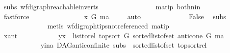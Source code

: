 \begin{isabellebody}
\ subs\ wf{\isacharunderscore}{\kern0pt}digraph{\isachardot}{\kern0pt}reachable{}{\isacharunderscore}{\kern0pt}in{\isacharunderscore}{\kern0pt}verts{\isacharparenleft}{\kern0pt}{}{\isacharparenright}{\kern0pt}\ {}{\isacharparenleft}{\kern0pt}{}{\isacharcomma}{\kern0pt}{}{\isacharparenright}{\kern0pt}\ \isanewline
\ \ \ \ \ \ \ \ \ \ \ \ \ \ ma{\isacharunderscore}{\kern0pt}tip\ both{\isacharunderscore}{\kern0pt}nin\isanewline
\ \ \ \ \ \ \ \ \ \ \ \ \isamarkupfalse%
\ fastforce\ \ \isanewline
\ \ \ \ \ \ \ \ \ \ \isamarkupfalse%
\ \isamarkupfalse%
\ {\isachardoublequoteopen}x\ {\isasymrightarrow}\isactrlsup {\isacharplus}{\kern0pt}\isactrlbsub G\isactrlesub \ ma{\isachardoublequoteclose}\ \isamarkupfalse%
\ {}{\isacharparenleft}{\kern0pt}{}{\isacharparenright}{\kern0pt}\ \isamarkupfalse%
\ auto\isanewline
\ \ \ \ \ \ \ \ \ \ \isamarkupfalse%
\ \isamarkupfalse%
\ False\ \isamarkupfalse%
\ subs\ \ {}{\isacharparenleft}{\kern0pt}{}{\isacharparenright}{\kern0pt}\isanewline
\ \ \ \ \ \ \ \ \ \ \ \ \isamarkupfalse%
\ {\isacharparenleft}{\kern0pt}metis\ wf{\isacharunderscore}{\kern0pt}digraph{\isachardot}{\kern0pt}tips{\isacharunderscore}{\kern0pt}not{\isacharunderscore}{\kern0pt}referenced\ ma{\isacharunderscore}{\kern0pt}tip{\isacharparenright}{\kern0pt}\ \ \isanewline
\ \ \ \ \ \ \ \ \isamarkupfalse%
\isanewline
\ \ \ \ \ \ \ \ \isamarkupfalse%
\ x{\isacharunderscore}{\kern0pt}ant\isanewline
\ \ \ \ \ \ \ \ \isamarkupfalse%
\ \isamarkupfalse%
\ {\isachardoublequoteopen}{\isacharparenleft}{\kern0pt}y{\isacharcomma}{\kern0pt}x{\isacharparenright}{\kern0pt}\ {\isasymin}\ list{\isacharunderscore}{\kern0pt}to{\isacharunderscore}{\kern0pt}rel\ {\isacharparenleft}{\kern0pt}top{\isacharunderscore}{\kern0pt}sort\ G\ {\isacharparenleft}{\kern0pt}sorted{\isacharunderscore}{\kern0pt}list{\isacharunderscore}{\kern0pt}of{\isacharunderscore}{\kern0pt}set\ {\isacharparenleft}{\kern0pt}anticone\ G\ ma{\isacharparenright}{\kern0pt}{\isacharparenright}{\kern0pt}{\isacharparenright}{\kern0pt}{\isachardoublequoteclose}\isanewline
\ \ \ \ \ \ \ \ \ \ \isamarkupfalse%
\ y{\isacharunderscore}{\kern0pt}ina\ DAG{\isachardot}{\kern0pt}anticon{\isacharunderscore}{\kern0pt}finite\ subs\ {}{\isacharparenleft}{\kern0pt}{}{\isacharcomma}{\kern0pt}{}{\isacharparenright}{\kern0pt}\ sorted{\isacharunderscore}{\kern0pt}list{\isacharunderscore}{\kern0pt}of{\isacharunderscore}{\kern0pt}set{\isacharparenleft}{\kern0pt}{}{\isacharparenright}{\kern0pt}\ top{\isacharunderscore}{\kern0pt}sort{\isacharunderscore}{\kern0pt}rel\isanewline

\end{isabellebody}
